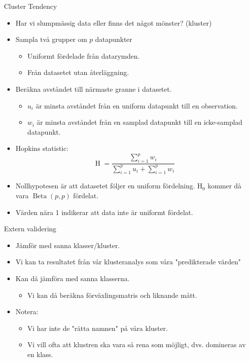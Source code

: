 \documentclass[10pt,english]{beamer}
\begin{document}
\begin{frame}{Cluster Tendency}

    \begin{itemize}
        \item Har vi slumpmässig data eller finns det något mönster? (kluster)
        \item Sampla två grupper om $p$ datapunkter
        \begin{itemize}
            \item Uniformt fördelade från datarymden.
            \item Från datasetet utan återläggning.
        \end{itemize}
        \item Beräkna avståndet till närmaste granne i datasetet.
        \begin{itemize}
            \item $u_i$ är minsta avståndet från en uniform datapunkt till en observation.
            \item $w_i$ är minsta avståndet från en samplad datapunkt till en icke-samplad datapunkt.
        \end{itemize}
        \item Hopkins statistic:
        \begin{equation*}
            \operatorname{H}=\frac{\sum_{i=1}^{p}w_i}{\sum_{i=1}^{p}u_i + \sum_{i=1}^{p}w_i}
        \end{equation*}
        \item Nollhypotesen är att datasetet följer en uniform fördelning. $\operatorname{H_0}$ kommer då vara $\operatorname{Beta}(p,p)$ fördelat.
        \item Värden nära 1 indikerar att data inte är uniformt fördelat.
        
    \end{itemize}
    
\end{frame}

\begin{frame}{Extern validering}

    \begin{itemize}
        \item Jämför med sanna klasser/kluster.
        \item Vi kan ta resultatet från vår klusteranalys som våra "predikterade värden"
        \item Kan då jämföra med sanna klasserna.
        \begin{itemize}
            \item Vi kan då beräkna förväxlingsmatris och liknande mått.
        \end{itemize}
        \item Notera:
        \begin{itemize}
            \item Vi har inte de "rätta namnen" på våra kluster.
            \item Vi vill ofta att klustren ska vara så rena som möjligt, dvs. domineras av en klass.
        \end{itemize}
    \end{itemize}
    
\end{frame}
\end{document}
